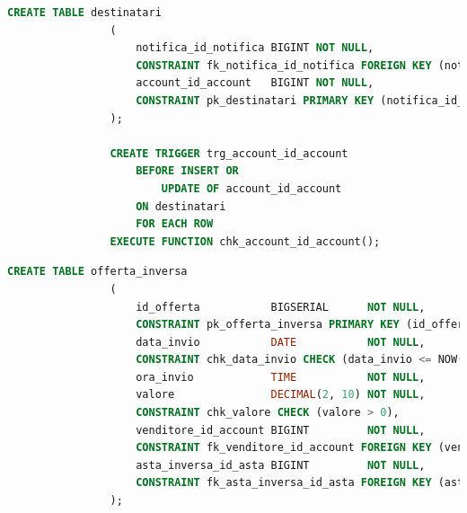             \begin{lstlisting}[language=SQL, caption=Relazione destinatari]
                CREATE TABLE destinatari
                (
                    notifica_id_notifica BIGINT NOT NULL,
                    CONSTRAINT fk_notifica_id_notifica FOREIGN KEY (notifica_id_notifica) REFERENCES notifica (id_notifica) ON UPDATE CASCADE ON DELETE CASCADE,
                    account_id_account   BIGINT NOT NULL,
                    CONSTRAINT pk_destinatari PRIMARY KEY (notifica_id_notifica, account_id_account)
                );
                
                CREATE TRIGGER trg_account_id_account
                    BEFORE INSERT OR
                        UPDATE OF account_id_account
                    ON destinatari
                    FOR EACH ROW
                EXECUTE FUNCTION chk_account_id_account();
            \end{lstlisting}
            
            \begin{lstlisting}[language=SQL, caption=Relazione offerta inversa]
                CREATE TABLE offerta_inversa
                (
                    id_offerta           BIGSERIAL      NOT NULL,
                    CONSTRAINT pk_offerta_inversa PRIMARY KEY (id_offerta),
                    data_invio           DATE           NOT NULL,
                    CONSTRAINT chk_data_invio CHECK (data_invio <= NOW()),
                    ora_invio            TIME           NOT NULL,
                    valore               DECIMAL(2, 10) NOT NULL,
                    CONSTRAINT chk_valore CHECK (valore > 0),
                    venditore_id_account BIGINT         NOT NULL,
                    CONSTRAINT fk_venditore_id_account FOREIGN KEY (venditore_id_account) REFERENCES venditore (id_account) ON UPDATE CASCADE ON DELETE CASCADE,
                    asta_inversa_id_asta BIGINT         NOT NULL,
                    CONSTRAINT fk_asta_inversa_id_asta FOREIGN KEY (asta_inversa_id_asta) REFERENCES asta_inversa (id_asta) ON UPDATE CASCADE ON DELETE CASCADE
                );
            \end{lstlisting}
            
